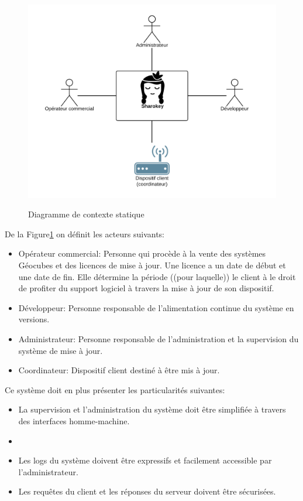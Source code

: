 \documentclass{themeensg}
\begin{document}
\begin{figure}[h!]
\includegraphics[scale=0.9]{images/context_general.png}
\label{fig:context_statique}
\centering
\caption{Diagramme de contexte statique}
\end{figure}

De la Figure\ref{fig:context_statique} on définit les acteurs suivants:
\begin{itemize}
\item Opérateur commercial: Personne qui procède à la vente des systèmes Géocubes et des licences de mise à jour. Une licence a un date de début et une date de fin. Elle détermine la période ((pour laquelle)) le client à le droit de profiter du support logiciel à travers la mise à jour de son dispositif.
\item Développeur: Personne responsable de l'alimentation continue du système en versions.
\item Administrateur: Personne responsable de l'administration et la supervision du système de mise à jour.
\item Coordinateur: Dispositif client destiné à être mis à jour.
\end{itemize}

Ce système doit en plus présenter les particularités suivantes:
\begin{itemize}
\item La supervision et l'administration du système doit être simplifiée à travers des interfaces homme-machine.
\item 
\item Les logs du système doivent être expressifs et facilement accessible par l'administrateur.
\item Les requêtes du client et les réponses du serveur doivent être sécurisées.

\end{itemize}
\end{document}
